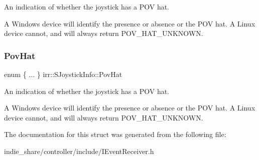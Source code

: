 An indication of whether the joystick has a P\+OV hat. 

A Windows device will identify the presence or absence or the P\+OV hat. A Linux device cannot, and will always return P\+O\+V\+\_\+\+H\+A\+T\+\_\+\+U\+N\+K\+N\+O\+WN. \mbox{\label{structirr_1_1SJoystickInfo_a7ae6fd321ceed7a05aeb07c4e3009238}} 
\subsubsection{\texorpdfstring{Pov\+Hat}{PovHat}\hspace{0.1cm}{\footnotesize\ttfamily [2/2]}}
{\footnotesize\ttfamily enum \{ ... \}   irr\+::\+S\+Joystick\+Info\+::\+Pov\+Hat}



An indication of whether the joystick has a P\+OV hat. 

A Windows device will identify the presence or absence or the P\+OV hat. A Linux device cannot, and will always return P\+O\+V\+\_\+\+H\+A\+T\+\_\+\+U\+N\+K\+N\+O\+WN. 

The documentation for this struct was generated from the following file\+:\begin{DoxyCompactItemize}
\item 
indie\+\_\+share/controller/include/I\+Event\+Receiver.\+h\end{DoxyCompactItemize}

